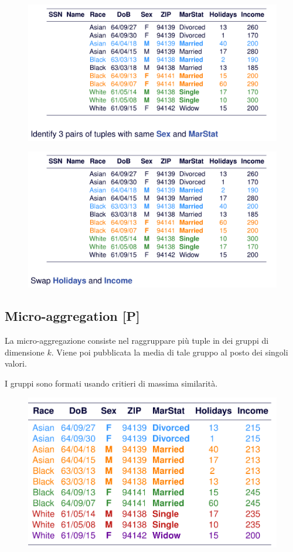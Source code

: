 \documentclass{report}
\begin{document}
\begin{figure}[ht]
    \centering
    \includegraphics[width=0.75\linewidth]{images/swapping1.png}
\end{figure}
\begin{figure}[ht]
    \centering
    \includegraphics[width=0.75\linewidth]{images/swapping2.png}
\end{figure}

\newpage
\subsection{Micro-aggregation [P]}
La micro-aggregazione consiste nel raggruppare più tuple in dei gruppi 
di dimensione $k$. Viene poi pubblicata la media di tale gruppo al posto 
dei singoli valori.

I gruppi sono formati usando critieri di massima similarità.

\begin{figure}[ht]
    \centering
    \includegraphics[width=0.75\linewidth]{images/micro-agg.png}
\end{figure}
\end{document}
